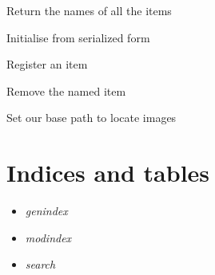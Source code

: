\documentclass[letterpaper,10pt,english]{sphinxmanual}
\begin{document}
\begin{fulllineitems}

\begin{fulllineitems}
\label{common:serge.registry.GeneralStore.getNames}
Return the names of all the items

\end{fulllineitems}


\begin{fulllineitems}
\label{common:serge.registry.GeneralStore.init}
Initialise from serialized form

\end{fulllineitems}


\begin{fulllineitems}
\label{common:serge.registry.GeneralStore.registerItem}
Register an item

\end{fulllineitems}


\begin{fulllineitems}
\label{common:serge.registry.GeneralStore.removeItem}
Remove the named item

\end{fulllineitems}


\begin{fulllineitems}
\label{common:serge.registry.GeneralStore.setPath}
Set our base path to locate images

\end{fulllineitems}


\end{fulllineitems}



\chapter{Indices and tables}
\label{index:indices-and-tables}\begin{itemize}
\item {} 
\emph{genindex}

\item {} 
\emph{modindex}

\item {} 
\emph{search}

\end{itemize}
\end{document}
